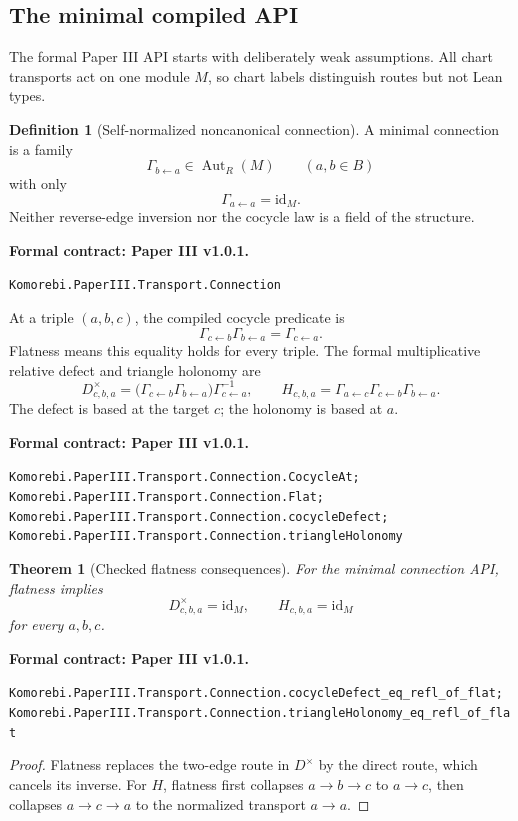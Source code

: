 \documentclass[11pt,a4paper]{article}
\newtheorem{theorem}{Theorem}[section]
\theoremstyle{plain}
\theoremstyle{definition}
\newtheorem{definition}[definition]{Definition}
\theoremstyle{remark}
\newcommand{\id}{\mathrm{id}}
\newcommand{\leanname}[1]{\nolinkurl{#1}}
\newcommand{\statusleanthree}[1]{\par\smallskip\noindent\begin{minipage}{\linewidth}{\color{leanblue}\textbf{Formal contract: Paper III v1.0.1.}}\par\begingroup\small\raggedright\leanname{#1}\par\endgroup\end{minipage}\par\smallskip}
\begin{document}
\subsection{The minimal compiled API}

The formal Paper III API starts with deliberately weak assumptions.  All
chart transports act on one module $M$, so chart labels distinguish routes
but not Lean types.

\begin{definition}[Self-normalized noncanonical connection]
\label{def:minimal-connection}
A minimal connection is a family
\[
\Gamma_{b\leftarrow a}\in\operatorname{Aut}_R(M)
\qquad(a,b\in B)
\]
with only
\[
\Gamma_{a\leftarrow a}=\id_M.
\]
Neither reverse-edge inversion nor the cocycle law is a field of the
structure.
\end{definition}
\statusleanthree{Komorebi.PaperIII.Transport.Connection}

At a triple $(a,b,c)$, the compiled cocycle predicate is
\[
\Gamma_{c\leftarrow b}\Gamma_{b\leftarrow a}
=\Gamma_{c\leftarrow a}.
\]
Flatness means this equality holds for every triple.  The formal
multiplicative relative defect and triangle holonomy are
\[
D^\times_{c,b,a}
=
\bigl(\Gamma_{c\leftarrow b}\Gamma_{b\leftarrow a}\bigr)
\Gamma_{c\leftarrow a}^{-1},
\qquad
H_{c,b,a}
=
\Gamma_{a\leftarrow c}
\Gamma_{c\leftarrow b}
\Gamma_{b\leftarrow a}.
\]
The defect is based at the target $c$; the holonomy is based at $a$.
\statusleanthree{Komorebi.PaperIII.Transport.Connection.CocycleAt; Komorebi.PaperIII.Transport.Connection.Flat; Komorebi.PaperIII.Transport.Connection.cocycleDefect; Komorebi.PaperIII.Transport.Connection.triangleHolonomy}

\begin{theorem}[Checked flatness consequences]
\label{thm:minimal-flatness}
For the minimal connection API, flatness implies
\[
D^\times_{c,b,a}=\id_M,
\qquad
H_{c,b,a}=\id_M
\]
for every $a,b,c$.
\end{theorem}
\statusleanthree{Komorebi.PaperIII.Transport.Connection.cocycleDefect_eq_refl_of_flat; Komorebi.PaperIII.Transport.Connection.triangleHolonomy_eq_refl_of_flat}

\begin{proof}
Flatness replaces the two-edge route in $D^\times$ by the direct route,
which cancels its inverse.  For $H$, flatness first collapses $a\to b\to c$
to $a\to c$, then collapses $a\to c\to a$ to the normalized transport
$a\to a$.
\end{proof}
\end{document}
